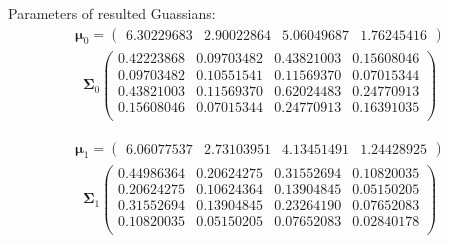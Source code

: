 \documentclass[11pt,a4paper]{article}
\newcommand{\htab}{\hspace*{0.63cm}}
\newcommand{\bs}[1]{\boldsymbol{#1}}
\begin{document}
\htab Parameters of resulted Guassians:
\begin{align} \bs{\mu}_{0} = \begin{pmatrix} 
6.30229683 & 2.90022864 & 5.06049687 & 1.76245416 
 \end{pmatrix}  \end{align}\vspace{-1cm} 
\begin{align} \bs{\Sigma}_{0}\begin{pmatrix} 
0.42223868 & 0.09703482 & 0.43821003 & 0.15608046 \\ 
0.09703482 & 0.10551541 & 0.11569370 & 0.07015344 \\ 
0.43821003 & 0.11569370 & 0.62024483 & 0.24770913 \\ 
0.15608046 & 0.07015344 & 0.24770913 & 0.16391035 \\ 
\end{pmatrix} \end{align}

\begin{align} \bs{\mu}_{1} = \begin{pmatrix} 
6.06077537 & 2.73103951 & 4.13451491 & 1.24428925 
 \end{pmatrix}  \end{align}\vspace{-1cm} 
\begin{align} \bs{\Sigma}_{1}\begin{pmatrix} 
0.44986364 & 0.20624275 & 0.31552694 & 0.10820035 \\ 
0.20624275 & 0.10624364 & 0.13904845 & 0.05150205 \\ 
0.31552694 & 0.13904845 & 0.23264190 & 0.07652083 \\ 
0.10820035 & 0.05150205 & 0.07652083 & 0.02840178 \\ 
\end{pmatrix} \end{align}
\end{document}
